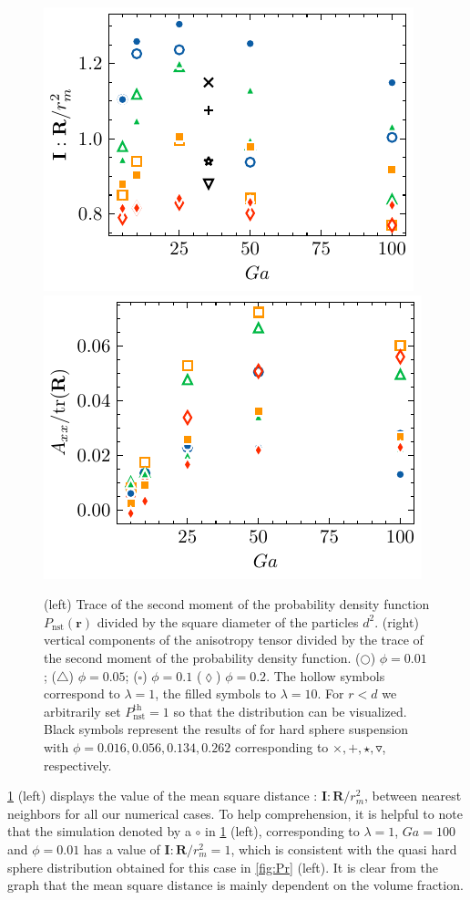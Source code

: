 \begin{figure}[h!]
    \centering
    \includegraphics[height=0.3\textwidth]{image/HOMOGENEOUS_NEW/PA/trR.pdf}
    \includegraphics[height=0.3\textwidth]{image/HOMOGENEOUS_NEW/PA/Axx.pdf}
    \caption{
        (left) Trace of the second moment of the probability density function $P_\text{nst}(\textbf{r})$ divided by the square diameter of the particles $d^2$. 
        (right) vertical components of the anisotropy tensor divided by the trace of the second moment of the probability density function.
    ($\pmb\bigcirc$) $\phi = 0.01$; ($\pmb\triangle$) $ \phi = 0.05$; ($\pmb\square$) $\phi = 0.1$ ($\pmb\lozenge$) $\phi = 0.2$.
    The hollow symbols correspond to $\lambda = 1$, the filled symbols to $\lambda = 10$.
    For $r<d$ we arbitrarily set $P_\text{nst}^\text{th} = 1$ so that the distribution can be visualized.
    Black symbols represent the results of \citet{zhang2023evolution} for hard sphere suspension with $\phi = 0.016,0.056,0.134,0.262$  %
    corresponding to $\pmb\times,\pmb +, \pmb\star , \pmb\triangledown$, respectively.
    }
    \label{fig:A}
\end{figure}
\ref{fig:A} (left) displays the value of the mean square distance : $\textbf{I}:\textbf{R}/r_m^2$, between nearest neighbors for all our numerical cases. 
To help comprehension, it is helpful to note that the simulation denoted by a \textcolor{col1}{$\pmb\circ$} in \ref{fig:A} (left), corresponding to $\lambda = 1$, $Ga = 100$ and $\phi = 0.01$ has a value of $\textbf{I}:\textbf{R}/r_m^2 = 1$, which is consistent with the quasi hard sphere distribution obtained for this case in \ref{fig:Pr} (left). 
It is clear from the graph that the mean square distance is mainly dependent on the volume fraction. 
